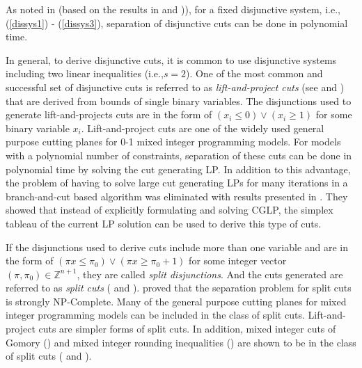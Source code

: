 As noted in \citet{Caprara03} (based on the results in \citet{Balas93} and
\citet{Balas96})), for a fixed disjunctive system, i.e.,
(\ref{dissys1}) - (\ref{dissys3}), separation of disjunctive cuts
can be done in polynomial time.

In general, to derive disjunctive cuts, it is common to use disjunctive
systems including two linear inequalities (i.e.,$s = 2$).
One of the most common and successful set of disjunctive cuts is referred to as
{\em lift-and-project cuts} (see \citet{Balas93} and \citet{Balas96}) that are
derived from bounds of single binary variables. The disjunctions used to generate
lift-and-projects cuts are in the form of $(x_i \leq 0) \vee (x_i \geq 1)$ for some
binary variable $x_i$. Lift-and-project cuts are one of the widely used
general purpose cutting planes for 0-1  mixed integer programming models.
For models with a polynomial number of constraints, separation of these cuts
can be done in polynomial time by solving the cut generating LP. In addition to this
advantage, the problem of having to solve large cut generating LPs for many iterations
in a branch-and-cut based algorithm was eliminated with results presented in
\citet{Balas03}. They showed that instead of explicitly formulating and solving CGLP,
the simplex tableau of the current LP solution can be used to derive this type of cuts.


If the disjunctions used to derive cuts include more than one variable and
are in the form of $(\pi x \leq \pi_0) \vee (\pi x \geq \pi_0 + 1)$ for some
integer vector $(\pi,\pi_0)\in \mathbb{Z}^{n+1}$, they are called {\em split disjunctions}.
And the cuts generated are referred to as {\em split cuts} (\citet{Cook90} and \citet{Balas08}).
\citet{Caprara03} proved that the separation problem for split cuts is strongly NP-Complete.
Many of the general purpose cutting planes for mixed integer programming models
can be included in the class of split cuts. Lift-and-project cuts are simpler forms of
split cuts. In addition,  mixed integer cuts of Gomory (\citet{Gomory63}) and mixed integer
rounding inequalities (\citet{Nemhauser90}) are shown to be in the class of split cuts
(\citet{Cornuejols01} and \citet{Cornuejols06}).

